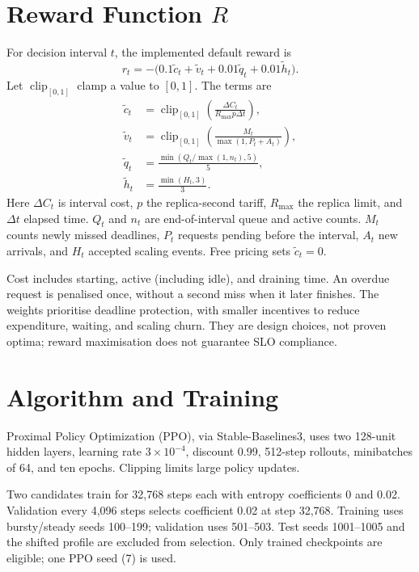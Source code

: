 \documentclass[10pt,a4paper,twocolumn]{article}
\begin{document}
\section{Reward Function \texorpdfstring{$R$}{R}}
For decision interval $t$, the implemented default reward is
\begin{equation*}
r_t=-\bigl(0.1\tilde c_t+\tilde v_t+
             0.01\tilde q_t+0.01\tilde h_t\bigr).
\end{equation*}
Let $\operatorname{clip}_{[0,1]}$ clamp a value to $[0,1]$. The terms are
\begin{align*}
\tilde c_t&=\operatorname{clip}_{[0,1]}
 \left(\frac{\Delta C_t}{R_{\max}p\Delta t}\right),\\
\tilde v_t&=\operatorname{clip}_{[0,1]}
 \left(\frac{M_t}{\max(1,P_t+A_t)}\right),\\
\tilde q_t&=\frac{\min(Q_t/\max(1,n_t),5)}{5},\\
\tilde h_t&=\frac{\min(H_t,3)}{3}.
\end{align*}
Here $\Delta C_t$ is interval cost, $p$ the replica-second tariff,
$R_{\max}$ the replica limit, and $\Delta t$ elapsed time. $Q_t$ and $n_t$
are end-of-interval queue and active counts. $M_t$ counts newly missed
deadlines, $P_t$ requests pending before the interval, $A_t$ new arrivals,
and $H_t$ accepted scaling events. Free pricing sets $\tilde c_t=0$.

Cost includes starting, active (including idle), and draining time.
An overdue request is penalised once, without a second miss when it later
finishes. The weights prioritise deadline protection, with smaller incentives
to reduce expenditure, waiting, and scaling churn. They are design choices,
not proven optima; reward maximisation does not guarantee SLO compliance.

\section{Algorithm and Training}
Proximal Policy Optimization (PPO), via Stable-Baselines3, uses two 128-unit
hidden layers, learning rate
$3\times10^{-4}$, discount 0.99, 512-step rollouts, minibatches of 64, and ten
epochs. Clipping limits large policy updates.

Two candidates train for 32,768 steps each with entropy coefficients 0 and 0.02.
Validation every 4,096 steps selects coefficient 0.02 at step 32,768.
Training uses bursty/steady seeds 100--199; validation uses 501--503.
Test seeds 1001--1005 and the shifted profile are excluded from selection.
Only trained checkpoints are eligible; one PPO seed (7) is used.
\end{document}
